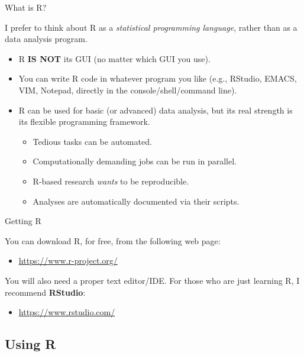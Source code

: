 \documentclass[10pt]{beamer}
\newcommand{\pkg}[1]{\textbf{#1}}
\begin{document}
\begin{frame}{What is R?}

  I prefer to think about R as a \emph{statistical programming language}, rather 
  than as a data analysis program.
  \vb
  \begin{itemize}
  \item R \textbf{IS NOT} its GUI (no matter which GUI you use).
    \vb
  \item You can write R code in whatever program you like (e.g., RStudio, EMACS, 
    VIM, Notepad, directly in the console/shell/command line).
    \vb
  \item R can be used for basic (or advanced) data analysis, but its real 
    strength is its flexible programming framework.
    \vc
    \begin{itemize}
      \item Tedious tasks can be automated.
        \vc
      \item Computationally demanding jobs can be run in parallel.
        \vc
      \item R-based research \emph{wants} to be reproducible.
        \vc
      \item Analyses are automatically documented via their scripts.
    \end{itemize}
  \end{itemize}

\end{frame}


\begin{frame}{Getting R}

  You can download R, for free, from the following web page:
  \va
  \begin{itemize}
  \item \url{https://www.r-project.org/}
  \end{itemize}
  \va
  You will also need a proper text editor/IDE. For those who are just learning R, 
  I recommend \pkg{RStudio}:
  \va
  \begin{itemize}
  \item \url{https://www.rstudio.com/}
  \end{itemize}

\end{frame}


\subsection{Using R}
\end{document}
